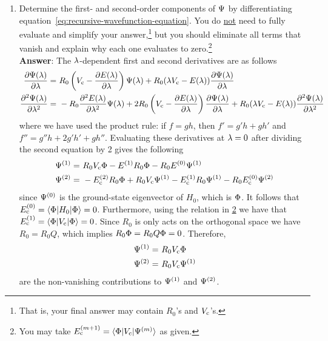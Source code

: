 \documentclass[11pt]{article}
\begin{document}
\begin{enumerate}
\newpage
\item
Determine the first- and second-order components of $\Psi $ by differentiating equation~\ref{eq:recursive-wavefunction-equation}.
You do \ul{not} need to fully evaluate and simplify your answer,\footnote{That is, your final answer may contain $R_0$'s and $V_{\mathrm{c}}$'s.} but you should eliminate all terms that vanish and explain why each one evaluates to zero.\footnote{\label{fn:pt-energy}You may take $E_{\mathrm{c}}^{(m+1)}=\langle\Phi |V_{\mathrm{c}}|\Psi ^{(m)}\rangle$ as given.}\\[10pt]
\textbf{Answer}:
The $\lambda $-dependent first and second derivatives are as follows
\begin{align*}
  \frac {\partial\Psi (\lambda )}{\partial\lambda }
=&\
  R_0
  \left(
    V_{\mathrm{c}}
  -
    \frac {\partial E(\lambda )}{\partial\lambda }
  \right)
  \Psi (\lambda )
+
  R_0
  (
    \lambda 
    V_{\mathrm{c}}
  -
    E(\lambda )
  )
  \frac {\partial\Psi (\lambda )}{\partial\lambda }
\\
  \frac {\partial^2\Psi (\lambda )}{\partial\lambda ^2}
=&\
-
  R_0
  \frac {\partial^2E(\lambda )}{\partial\lambda ^2}
  \Psi (\lambda )
+
  2
  R_0
  \left(
    V_{\mathrm{c}}
  -
    \frac {\partial E(\lambda )}{\partial\lambda }
  \right)
  \frac {\partial\Psi (\lambda )}{\partial\lambda }
+
  R_0
  (
    \lambda 
    V_{\mathrm{c}}
  -
    E(\lambda )
  )
  \frac {\partial^2\Psi (\lambda )}{\partial\lambda ^2}
\end{align*}
where we have used the product rule:
if $f=gh$, then $f'=g'h+ gh'$ and $f''=g''h + 2g'h' + gh''$.
Evaluating these derivatives at $\lambda =0$ after dividing the second equation by 2 gives the following
\begin{align*}
  \Psi ^{(1)}
=&\
  R_0
  V_{\mathrm{c}}
  \Phi 
-
  E^{(1)}
  R_0 
  \Phi 
-
  R_0
  E^{(0)}
  \Psi ^{(1)}
\\
  \Psi ^{(2)}
=&\
-
  E_{\mathrm{c}}^{(2)}
  R_0
  \Phi 
+
  R_0
  V_{\mathrm{c}}
  \Psi ^{(1)}
-
  E_{\mathrm{c}}^{(1)}
  R_0
  \Psi ^{(1)}
-
  R_0
  E_{\mathrm{c}}^{(0)}
  \Psi ^{(2)}
\end{align*}
since $\Psi ^{(0)}$ is the ground-state eigenvector of $H_0$, which is $\Phi $.
It follows that
$
  E_{\mathrm{c}}^{(0)}
=
  \langle\Phi |H_0|\Phi \rangle
=
  0
$.
Furthermore, using the relation in \cref{fn:pt-energy} we have that
$
  E_{\mathrm{c}}^{(1)}
=
  \langle\Phi |V_{\mathrm{c}}|\Phi \rangle
=
  0
$.
Since $R_0$ is only acts on the orthogonal space we have $R_0=R_0Q$, which implies
$
  R_0
  \Phi 
=
  R_0
  Q
  \Phi 
=
  0
$.
Therefore,
\begin{align*}
  \Psi ^{(1)}
=&\
  R_0
  V_{\mathrm{c}}
  \Phi 
\\
  \Psi ^{(2)}
=&\
  R_0
  V_{\mathrm{c}}
  \Psi ^{(1)}
\end{align*}
are the non-vanishing contributions to $\Psi ^{(1)}$ and $\Psi ^{(2)}$.


\end{enumerate}
\end{document}
